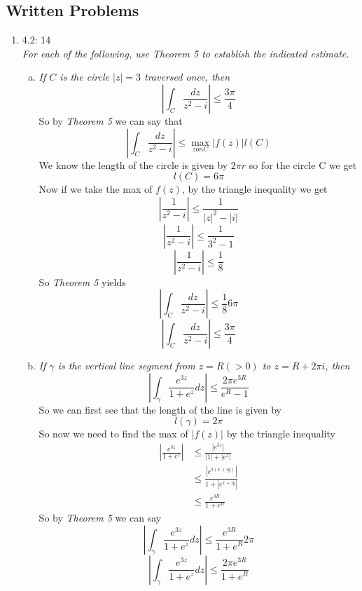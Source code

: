 \documentclass[11pt]{article}
\begin{document}

\subsection*{Written Problems}
\begin{enumerate}
\item 4.2: 14\\
\textit{For each of the following, use Theorem 5 to establish the indicated estimate.}
\begin{enumerate}[(a)]
\item \textit{If $C$ is the circle $|z|=3$ traversed once, then}
$$\left|\int_C\frac{dz}{z^2-i}\right|\le \frac{3\pi}{4}$$
So by \emph{Theorem 5} we can say that
$$\left|\int_C\frac{dz}{z^2-i}\right|\le \max_{z on C}|f(z)|l(C)$$
We know the length of the circle is given by $2\pi r$ so for the circle C we get
$$l(C) = 6\pi$$
Now if we take the max of $f(z)$, by the triangle inequality we get
$$\left|\frac{1}{z^2-i}\right|\le \frac{1}{|z|^2-|i|}$$
$$\left|\frac{1}{z^2-i}\right|\le \frac{1}{3^2-1}$$
$$\left|\frac{1}{z^2-i}\right|\le \frac{1}{8}$$
So \emph{Theorem 5} yields
$$\left|\int_C\frac{dz}{z^2-i}\right|\le \frac{1}{8}6\pi$$
$$\left|\int_C\frac{dz}{z^2-i}\right|\le \frac{3\pi}{4}$$

\item
\textit{If $\gamma$ is the vertical line segment from $z=R (>0)$ to $z=R+2\pi i$, then}
$$\left|\int_{\gamma} \frac{e^{3z}}{1+e^z}dz\right| \le \frac{2\pi e^{3R}}{e^R-1}$$
So we can first see that the length of the line is given by
$$l(\gamma) = 2\pi$$
So now we need to find the max of $|f(z)|$ by the triangle inequality
\begin{align*}
\left|\frac{e^{3z}}{1+e^z}\right| &\le \frac{|e^{3z}|}{|1|+|e^z|}\\
&\le \frac{|e^{3(x+iy)}|}{1+|e^{x+iy}|}\\
&\le \frac{e^{3R}}{1+e^{R}}
\end{align*}
So by \emph{Theorem 5} we can say
$$\left|\int_{\gamma} \frac{e^{3z}}{1+e^z}dz\right| \le \frac{e^{3R}}{1+e^R}2\pi$$
$$\left|\int_{\gamma} \frac{e^{3z}}{1+e^z}dz\right| \le \frac{2\pi e^{3R}}{1+e^R}$$


\end{enumerate}
\end{enumerate}
\end{document}
